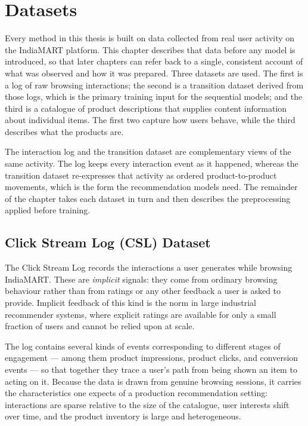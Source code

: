 \chapter{Datasets}
\label{ch:datasets}

Every method in this thesis is built on data collected from real user activity
on the IndiaMART platform. This chapter describes that data before any model is
introduced, so that later chapters can refer back to a single, consistent
account of what was observed and how it was prepared. Three datasets are used.
The first is a log of raw browsing interactions; the second is a transition
dataset derived from those logs, which is the primary training input for the
sequential models; and the third is a catalogue of product descriptions that
supplies content information about individual items. The first two capture how
users behave, while the third describes what the products are.

The interaction log and the transition dataset are complementary views of the
same activity. The log keeps every interaction event as it happened, whereas
the transition dataset re-expresses that activity as ordered product-to-product
movements, which is the form the recommendation models need. The remainder of
the chapter takes each dataset in turn and then describes the preprocessing
applied before training.

\section{Click Stream Log (CSL) Dataset}
\label{sec:csl}

The Click Stream Log records the interactions a user generates while browsing
IndiaMART. These are \emph{implicit} signals: they come from ordinary browsing
behaviour rather than from ratings or any other feedback a user is asked to
provide. Implicit feedback of this kind is the norm in large industrial
recommender systems, where explicit ratings are available for only a small
fraction of users and cannot be relied upon at scale.

The log contains several kinds of events corresponding to different stages of
engagement --- among them product impressions, product clicks, and conversion
events --- so that together they trace a user's path from being shown an item to
acting on it. Because the data is drawn from genuine browsing sessions, it
carries the characteristics one expects of a production recommendation setting:
interactions are sparse relative to the size of the catalogue, user interests
shift over time, and the product inventory is large and heterogeneous.

